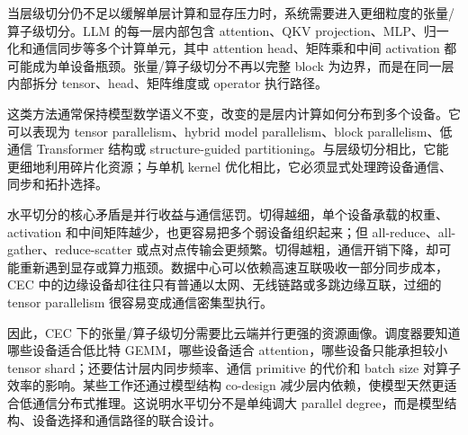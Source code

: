 \documentclass[a4paper,10pt]{ctexart}
\begin{document}
当层级切分仍不足以缓解单层计算和显存压力时，系统需要进入更细粒度的张量/算子级切分。LLM 的每一层内部包含 attention、QKV projection、MLP、归一化和通信同步等多个计算单元，其中 attention head、矩阵乘和中间 activation 都可能成为单设备瓶颈。张量/算子级切分不再以完整 block 为边界，而是在同一层内部拆分 tensor、head、矩阵维度或 operator 执行路径。


这类方法通常保持模型数学语义不变，改变的是层内计算如何分布到多个设备。它可以表现为 tensor parallelism、hybrid model parallelism、block parallelism、低通信 Transformer 结构或 structure-guided partitioning。与层级切分相比，它能更细地利用碎片化资源；与单机 kernel 优化相比，它必须显式处理跨设备通信、同步和拓扑选择。


水平切分的核心矛盾是并行收益与通信惩罚。切得越细，单个设备承载的权重、activation 和中间矩阵越少，也更容易把多个弱设备组织起来；但 all-reduce、all-gather、reduce-scatter 或点对点传输会更频繁。切得越粗，通信开销下降，却可能重新遇到显存或算力瓶颈。数据中心可以依赖高速互联吸收一部分同步成本，CEC 中的边缘设备却往往只有普通以太网、无线链路或多跳边缘互联，过细的 tensor parallelism 很容易变成通信密集型执行。


因此，CEC 下的张量/算子级切分需要比云端并行更强的资源画像。调度器要知道哪些设备适合低比特 GEMM，哪些设备适合 attention，哪些设备只能承担较小 tensor shard；还要估计层内同步频率、通信 primitive 的代价和 batch size 对算子效率的影响。某些工作还通过模型结构 co-design 减少层内依赖，使模型天然更适合低通信分布式推理。这说明水平切分不是单纯调大 parallel degree，而是模型结构、设备选择和通信路径的联合设计。
\end{document}
